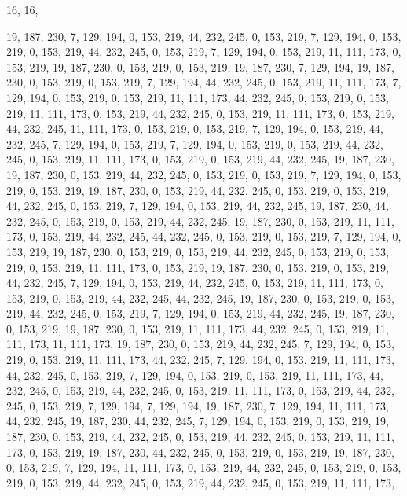 16, 16,

19, 187, 230, 7, 129, 194, 0, 153, 219, 44, 232, 245, 0, 153, 219, 7,
129, 194, 0, 153, 219, 0, 153, 219, 44, 232, 245, 0, 153, 219, 7, 129,
194, 0, 153, 219, 11, 111, 173, 0, 153, 219, 19, 187, 230, 0, 153, 219,
0, 153, 219, 19, 187, 230, 7, 129, 194, 19, 187, 230, 0, 153, 219, 0,
153, 219, 7, 129, 194, 44, 232, 245, 0, 153, 219, 11, 111, 173, 7, 129,
194, 0, 153, 219, 0, 153, 219, 11, 111, 173, 44, 232, 245, 0, 153, 219,
0, 153, 219, 11, 111, 173, 0, 153, 219, 44, 232, 245, 0, 153, 219, 11,
111, 173, 0, 153, 219, 44, 232, 245, 11, 111, 173, 0, 153, 219, 0, 153,
219, 7, 129, 194, 0, 153, 219, 44, 232, 245, 7, 129, 194, 0, 153, 219,
7, 129, 194, 0, 153, 219, 0, 153, 219, 44, 232, 245, 0, 153, 219, 11,
111, 173, 0, 153, 219, 0, 153, 219, 44, 232, 245, 19, 187, 230, 19, 187,
230, 0, 153, 219, 44, 232, 245, 0, 153, 219, 0, 153, 219, 7, 129, 194,
0, 153, 219, 0, 153, 219, 19, 187, 230, 0, 153, 219, 44, 232, 245, 0,
153, 219, 0, 153, 219, 44, 232, 245, 0, 153, 219, 7, 129, 194, 0, 153,
219, 44, 232, 245, 19, 187, 230, 44, 232, 245, 0, 153, 219, 0, 153, 219,
44, 232, 245, 19, 187, 230, 0, 153, 219, 11, 111, 173, 0, 153, 219, 44,
232, 245, 44, 232, 245, 0, 153, 219, 0, 153, 219, 7, 129, 194, 0, 153,
219, 19, 187, 230, 0, 153, 219, 0, 153, 219, 44, 232, 245, 0, 153, 219,
0, 153, 219, 0, 153, 219, 11, 111, 173, 0, 153, 219, 19, 187, 230, 0,
153, 219, 0, 153, 219, 44, 232, 245, 7, 129, 194, 0, 153, 219, 44, 232,
245, 0, 153, 219, 11, 111, 173, 0, 153, 219, 0, 153, 219, 44, 232, 245,
44, 232, 245, 19, 187, 230, 0, 153, 219, 0, 153, 219, 44, 232, 245, 0,
153, 219, 7, 129, 194, 0, 153, 219, 44, 232, 245, 19, 187, 230, 0, 153,
219, 19, 187, 230, 0, 153, 219, 11, 111, 173, 44, 232, 245, 0, 153, 219,
11, 111, 173, 11, 111, 173, 19, 187, 230, 0, 153, 219, 44, 232, 245, 7,
129, 194, 0, 153, 219, 0, 153, 219, 11, 111, 173, 44, 232, 245, 7, 129,
194, 0, 153, 219, 11, 111, 173, 44, 232, 245, 0, 153, 219, 7, 129, 194,
0, 153, 219, 0, 153, 219, 11, 111, 173, 44, 232, 245, 0, 153, 219, 44,
232, 245, 0, 153, 219, 11, 111, 173, 0, 153, 219, 44, 232, 245, 0, 153,
219, 7, 129, 194, 7, 129, 194, 19, 187, 230, 7, 129, 194, 11, 111, 173,
44, 232, 245, 19, 187, 230, 44, 232, 245, 7, 129, 194, 0, 153, 219, 0,
153, 219, 19, 187, 230, 0, 153, 219, 44, 232, 245, 0, 153, 219, 44, 232,
245, 0, 153, 219, 11, 111, 173, 0, 153, 219, 19, 187, 230, 44, 232, 245,
0, 153, 219, 0, 153, 219, 19, 187, 230, 0, 153, 219, 7, 129, 194, 11,
111, 173, 0, 153, 219, 44, 232, 245, 0, 153, 219, 0, 153, 219, 0, 153,
219, 44, 232, 245, 0, 153, 219, 44, 232, 245, 0, 153, 219, 11, 111, 173,
